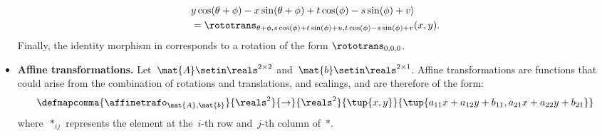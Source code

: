 \begin{solution}
\begin{itemize}
\begin{equation}
\begin{aligned}
                       & y\cos(\theta+\phi)-x\sin(\theta+\phi)+t\cos(\phi)-s\sin(\phi)+v\rangle \\
                       & =\rototrans_{\theta+\phi,s\cos(\phi)+t\sin(\phi)+u, t\cos(\phi)-s\sin(\phi)+v}(x,y).
                  \end{aligned}
              \end{equation}
              Finally, the identity morphism in \Draw corresponds to a rotation of the form $\rototrans_{0,0,0}$.
        \item \textbf{Affine transformations.}
              Let~$\mat{A}\setin \reals^{2\times 2}$ and~$\mat{b}\setin \reals^{2\times 1}$.
              Affine transformations are functions that could arise from the combination of rotations and translations, and scalings, and are therefore of the form:
              \begin{equation}
                  \defmapcomma{
                  \affinetrafo_{\mat{A},\mat{b}}
                  }{
                  \reals^2
                  }{
                  \to
                  }{
                  \reals^2
                  }{
                  \tup{x,y}
                  }{
                  \tup{a_{11}x+a_{12}y+b_{11},a_{21}x+a_{22}y+b_{21}}
                  }
              \end{equation}
              where~$*_{ij}$ represents the element at the~$i$-th row and~$j$-th column of~$*$.


\end{itemize}
\end{solution}
